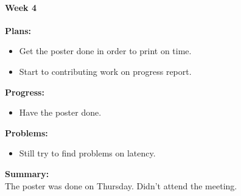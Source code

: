 \paragraph{Week 4}
\begin{adjustwidth}{2.5em}{0pt}
    \vspace{-0.5cm}\textbf{Plans:}
    \vspace{-0.5cm}
    \begin{itemize}
        \item Get the poster done in order to print on time.
        \item Start to contributing work on progress report.
    \end{itemize} 
    \vspace{-0.3cm}\textbf{Progress:}
    \vspace{-0.5cm}
    \begin{itemize}
        \item Have the poster done.
    \end{itemize} 
    \vspace{-0.3cm}\textbf{Problems:}
    \vspace{-0.5cm}
    \begin{itemize}
        \item Still try to find problems on latency.
    \end{itemize}  
    \vspace{-0.3cm}\noindent\textbf{Summary:}\\
    \noindent The poster was done on Thursday. Didn't attend the meeting.
\end{adjustwidth} 

